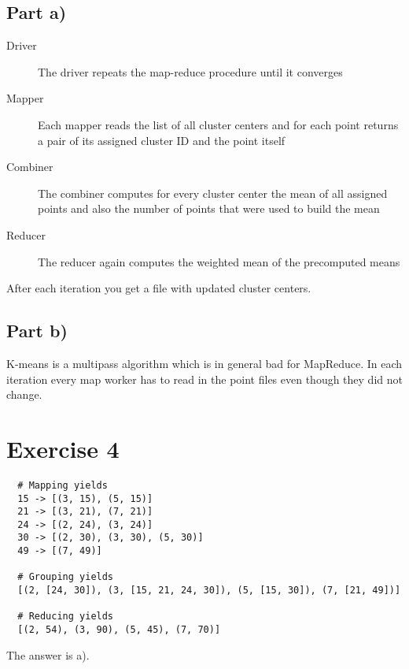 \documentclass[10pt,a4paper]{article}
\begin{document}
\subsection*{Part a)}

\begin{description}
\item[Driver] The driver repeats the map-reduce procedure until it converges
\item[Mapper] Each mapper reads the list of all cluster centers and for each point returns a pair of its assigned cluster ID and the point itself
\item[Combiner] The combiner computes for every cluster center the mean of all assigned points and also the number of points that were used to build the mean
\item[Reducer] The reducer again computes the weighted mean of the precomputed means
\end{description}

After each iteration you get a file with updated cluster centers.

\subsection*{Part b)}

K-means is a multipass algorithm which is in general bad for MapReduce.
In each iteration every map worker has to read in the point files even though they did not change.

\section*{Exercise 4}

\begin{verbatim}
  # Mapping yields
  15 -> [(3, 15), (5, 15)]
  21 -> [(3, 21), (7, 21)]
  24 -> [(2, 24), (3, 24)]
  30 -> [(2, 30), (3, 30), (5, 30)]
  49 -> [(7, 49)]

  # Grouping yields
  [(2, [24, 30]), (3, [15, 21, 24, 30]), (5, [15, 30]), (7, [21, 49])]

  # Reducing yields
  [(2, 54), (3, 90), (5, 45), (7, 70)]
\end{verbatim}

The answer is a).
\end{document}
